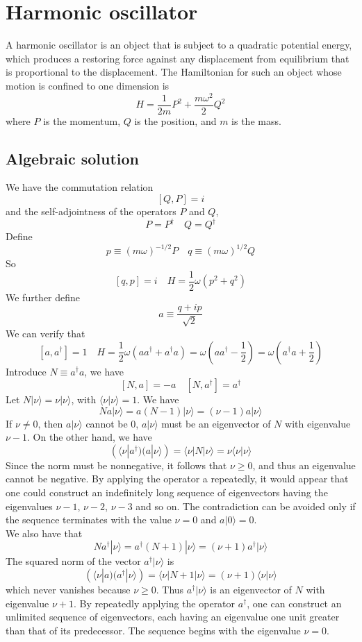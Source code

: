 \section{Harmonic oscillator}
A harmonic oscillator is an object that is subject to a quadratic potential energy, which produces a restoring force against any displacement from equilibrium that is proportional to the displacement. The Hamiltonian for such an object whose motion is confined to one dimension is
\[H = \frac{1}{2m}P^2 + \frac{m\omega^2}{2}Q^2\]
where $P$ is the momentum, $Q$ is the position, and $m$ is the mass.
\subsection{Algebraic solution}
We have the commutation relation
\[[Q,P] = i\]
and the self-adjointness of the operators $P$ and $Q$,
\[P = P^{\dagger} \quad Q = Q^{\dagger}\]
Define
\[ p \equiv (m\omega)^{-1/2}P \quad q \equiv (m\omega)^{1/2}Q\]
So
\[[q,p] = i \quad H = \frac{1}{2}\omega(p^2+q^2)\]
We further define
\[a \equiv \frac{q+ip}{\sqrt{2}}\]
We can verify that
\[[a,a^{\dagger}] = 1 \quad H = \frac{1}{2}\omega(aa^{\dagger}+a^{\dagger}a) = \omega(aa^{\dagger}-\frac{1}{2}) = \omega(a^{\dagger}a+\frac{1}{2})\]
Introduce $N \equiv a^{\dagger}a$, we have
\[[N,a] = -a \quad [N,a^{\dagger}] = a^{\dagger}\]
Let $N|\nu\rangle = \nu|\nu\rangle $, with $\langle \nu | \nu \rangle = 1$. We have
\[Na|\nu\rangle = a(N-1)|\nu\rangle = (\nu-1)a|\nu\rangle\]
If $\nu \neq 0$, then $a|\nu\rangle$ cannot be $0$, $a|\nu\rangle$ must be an eigenvector of $N$ with eigenvalue $\nu - 1$.
On the other hand, we have
\[(\langle \nu | a^{\dagger})(a|\nu\rangle) = \langle \nu | N | \nu \rangle = \nu \langle \nu | \nu \rangle\]
Since the norm must be nonnegative, it follows that $\nu \geq 0$, and thus an eigenvalue cannot be negative. By applying the operator a repeatedly, it would appear that one could construct an indefinitely long sequence of eigenvectors
having the eigenvalues $\nu-1$, $\nu-2$, $\nu-3$ and so on.
The contradiction can be avoided only if the sequence terminates with the value $\nu=0$ and $a|0\rangle = 0$.\\
We also have that
\[Na^{\dagger}|\nu\rangle = a^{\dagger}(N+1)|\nu\rangle = (\nu+1)a^{\dagger}|\nu\rangle\]
The squared norm of the vector $a^{\dagger} |\nu\rangle$ is
\[(\langle \nu | a)(a^{\dagger} | \nu \rangle)= \langle \nu | N+1|\nu\rangle = (\nu+1) \langle \nu | \nu \rangle \]
which never vanishes because $\nu \geq 0$. Thus $a^{\dagger} | \nu \rangle$ is an eigenvector of $N$ with eigenvalue $\nu+1$. By repeatedly applying the operator $a^{\dagger}$, one can construct an unlimited sequence of eigenvectors, each having an eigenvalue one unit greater than that of its predecessor. The sequence begins with the eigenvalue $\nu=0$.
